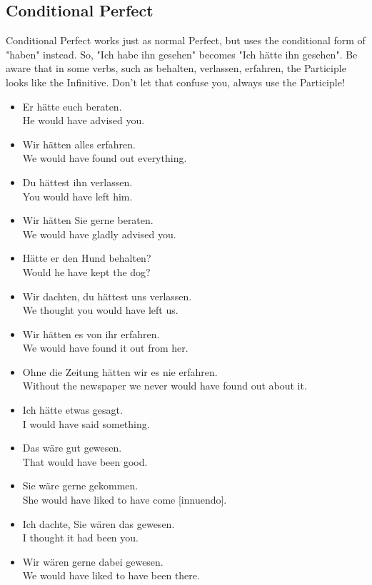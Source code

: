 \pagebreak
\subsection{Conditional Perfect}

Conditional Perfect works just as normal Perfect, but uses the conditional form of "haben" instead. So, "Ich habe ihn gesehen" becomes "Ich h{\"a}tte ihn gesehen".  Be aware that in some verbs, such as behalten, verlassen, erfahren, the Participle looks like the Infinitive. Don't let that confuse you, always use the Participle!

\begin{itemize}
  \item  Er h{\"a}tte euch beraten. \\
  He would have advised you.
  \item  Wir h{\"a}tten alles erfahren. \\
  We would have found out everything.
  \item  Du h{\"a}ttest ihn verlassen. \\
  You would have left him.
  \item  Wir h{\"a}tten Sie gerne beraten. \\
  We would have gladly advised you.
  \item  H{\"a}tte er den Hund behalten? \\
  Would he have kept the dog?
  \item  Wir dachten, du h{\"a}ttest uns verlassen. \\
  We thought you would have left us.
  \item  Wir h{\"a}tten es von ihr erfahren. \\
  We would have found it out from her.
  \item  Ohne die Zeitung h{\"a}tten wir es nie erfahren. \\
  Without the newspaper we never would have found out about it.
  \item  Ich h{\"a}tte etwas gesagt. \\
  I would have said something.
  \item  Das w{\"a}re gut gewesen. \\
  That would have been good.
  \item  Sie w{\"a}re gerne gekommen. \\
  She would have liked to have come [innuendo].
  \item  Ich dachte, Sie w{\"a}ren das gewesen. \\
  I thought it had been you.
  \item  Wir w{\"a}ren gerne dabei gewesen. \\
  We would have liked to have been there.
\end{itemize}